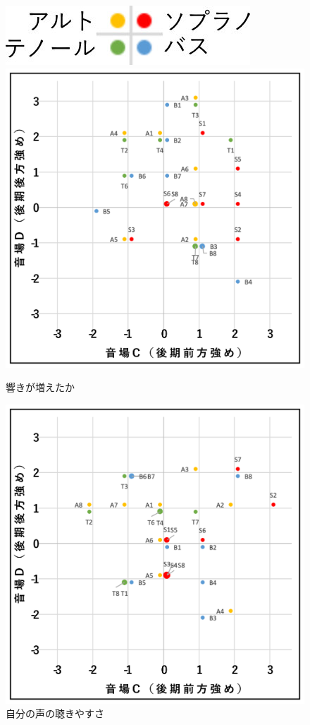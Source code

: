 \documentclass[11pt,a4j]{jreport}
\begin{document}
\begin{figure}[H]
  \begin{minipage}{1\linewidth}
    \centering
    \includegraphics[scale=.7]{images/subjectiveExp/scat_0_legend.jpg}
  \end{minipage}

  \begin{minipage}{0.5\linewidth}
    \centering
    \includegraphics[width=.9\linewidth]{images/subjectiveExp/scat_late_01reverb.png}
    \caption*{響きが増えたか}
  \end{minipage}%
  \begin{minipage}{0.5\linewidth}
    \centering
    \includegraphics[width=.9\linewidth]{images/subjectiveExp/scat_late_02selfVoice.png}
    \caption*{自分の声の聴きやすさ}
  \end{minipage}


\end{figure}
\end{document}
